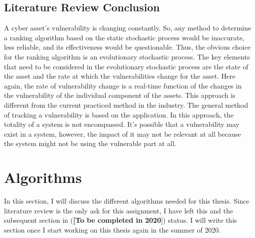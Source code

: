 \subsection{Literature Review Conclusion}\label{ref:lit_rev_conclusion}
A cyber asset's vulnerability is changing constantly. So, any method to determine a ranking algorithm based on the static stochastic process would be inaccurate, less reliable, and its effectiveness would be questionable. Thus, the obvious choice for the ranking algorithm is an evolutionary stochastic process. The key elements that need to be considered in the evolutionary stochastic process are the state of the asset and the rate at which the vulnerabilities change for the asset. Here again, the rate of vulnerability change is a real-time function of the changes in the vulnerability of the individual component of the assets. This approach is different from the current practiced method in the industry. The general method of tracking a vulnerability is based on the application. In this approach, the totality of a system is not encompassed. It's possible that a vulnerability may exist in a system, however, the impact of it may not be relevant at all because the system might not be using the vulnerable part at all.\\ 

\section{Algorithms} \label{sec:algo}
In this section, I will discuss the different algorithms needed for this thesis. Since literature review is the only ask for this assignment, I have left this and the subsequent section in (\textbf{[To be completed in 2020}]) status. I will write this section once I start working on this thesis again in the summer of 2020.
